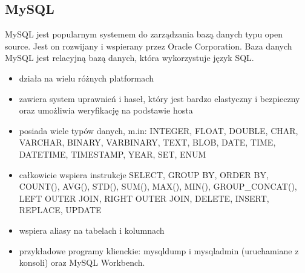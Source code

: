 \subsection{MySQL}
MySQL jest popularnym systemem do zarządzania bazą danych typu open source. Jest on rozwijany i wspierany przez Oracle Corporation.
Baza danych MySQL jest relacyjną bazą danych, która wykorzystuje język SQL. \cite{mysql}
\begin{itemize}
    \item działa na wielu różnych platformach
    \item zawiera system uprawnień i haseł, który jest bardzo elastyczny i bezpieczny oraz umożliwia weryfikację na podstawie hosta
    \item posiada wiele typów danych, m.in: INTEGER, FLOAT, DOUBLE, CHAR, VARCHAR, BINARY, VARBINARY, TEXT, BLOB, DATE, TIME, DATETIME, TIMESTAMP, YEAR, SET, ENUM
    \item całkowicie wspiera instrukcje SELECT, GROUP BY, ORDER BY, COUNT(), AVG(), STD(), SUM(), MAX(), MIN(), GROUP\_CONCAT(), LEFT OUTER JOIN, RIGHT OUTER JOIN,  DELETE, INSERT, REPLACE, UPDATE 
    \item wspiera aliasy na tabelach i kolumnach
    \item przykładowe programy klienckie: mysqldump i mysqladmin (uruchamiane z konsoli) oraz MySQL Workbench.

\end{itemize}
